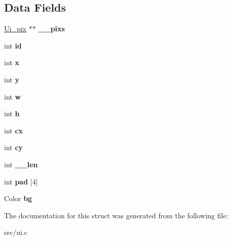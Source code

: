\subsection*{Data Fields}
\begin{DoxyCompactItemize}
\item 
\mbox{\label{struct__Ui__box_a03e07792d6c14766638d58e9e2edb844}} 
\hyperlink{struct__Ui__pix}{Ui\+\_\+pix} $\ast$$\ast$ {\bfseries \+\_\+\+\_\+pixs}
\item 
\mbox{\label{struct__Ui__box_a4aa502d3b25a87a1465283d9ccc9fa77}} 
int {\bfseries id}
\item 
\mbox{\label{struct__Ui__box_a6e8c0df6554097fd1d0d0aa84d40ac29}} 
int {\bfseries x}
\item 
\mbox{\label{struct__Ui__box_a7bacb19580dcf6ece3ca60b64f62e459}} 
int {\bfseries y}
\item 
\mbox{\label{struct__Ui__box_a90f1e8d481ccbf0cc06e3bbb1c12b386}} 
int {\bfseries w}
\item 
\mbox{\label{struct__Ui__box_ab81930762400818df39bd6acc348d26f}} 
int {\bfseries h}
\item 
\mbox{\label{struct__Ui__box_aa44d253872cfb9297e3fa71b93d9fc88}} 
int {\bfseries cx}
\item 
\mbox{\label{struct__Ui__box_a993ecc3e3509632642cb403b731d9a6d}} 
int {\bfseries cy}
\item 
\mbox{\label{struct__Ui__box_ade30a16b2e23d494a77767ce516f00d9}} 
int {\bfseries \+\_\+\+\_\+len}
\item 
\mbox{\label{struct__Ui__box_a4030a2fd2487e5a4cde2b4fccc999166}} 
int {\bfseries pad} \mbox{[}4\mbox{]}
\item 
\mbox{\label{struct__Ui__box_a2562527c18b6318ba537faae8dd2d06c}} 
Color {\bfseries bg}
\end{DoxyCompactItemize}


The documentation for this struct was generated from the following file\+:\begin{DoxyCompactItemize}
\item 
src/ui.\+c\end{DoxyCompactItemize}
